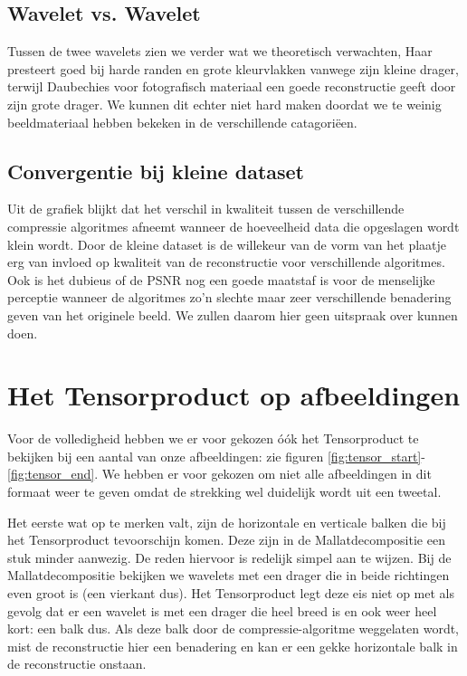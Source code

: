 \subsection{Wavelet vs. Wavelet}
Tussen de twee wavelets zien we verder wat we theoretisch verwachten, Haar presteert goed bij harde randen en grote kleurvlakken
vanwege zijn kleine drager, terwijl Daubechies voor fotografisch materiaal een goede reconstructie geeft door zijn grote drager.
We kunnen dit echter niet hard maken doordat we te weinig beeldmateriaal hebben bekeken in de verschillende catagori\"een. 

\subsection{Convergentie bij kleine dataset}
Uit de grafiek blijkt dat het verschil in kwaliteit tussen de verschillende compressie algoritmes afneemt wanneer
de hoeveelheid data die opgeslagen wordt klein wordt. 
Door de kleine dataset is de willekeur van de vorm van het plaatje erg van invloed op kwaliteit van de reconstructie 
voor verschillende algoritmes. 
Ook is het dubieus of de PSNR nog een goede maatstaf is voor de menselijke perceptie wanneer de algoritmes
zo'n slechte maar zeer verschillende benadering geven van het originele beeld.
We zullen daarom hier geen uitspraak over kunnen doen.

\section{Het Tensorproduct op afbeeldingen}
Voor de volledigheid hebben we er voor gekozen \'o\'ok het Tensorproduct te bekijken bij een aantal 
van onze afbeeldingen: zie figuren \ref{fig:tensor_start}-\ref{fig:tensor_end}. We hebben er voor 
gekozen om niet alle afbeeldingen in dit formaat weer te geven omdat de strekking wel duidelijk wordt 
uit een tweetal.

Het eerste wat op te merken valt, zijn de horizontale en verticale balken die bij het Tensorproduct 
tevoorschijn komen. Deze zijn in de Mallatdecompositie een stuk minder aanwezig. De reden 
hiervoor is redelijk simpel aan te wijzen. Bij de Mallatdecompositie bekijken we wavelets met een 
drager die in beide richtingen even groot is (een vierkant dus). Het Tensorproduct legt deze eis 
niet op met als gevolg dat er een wavelet is met een drager die heel breed is en ook weer 
heel kort: een balk dus. Als deze balk door de compressie-algoritme weggelaten wordt, mist de 
reconstructie hier een benadering en kan er een gekke horizontale balk in de reconstructie onstaan.

